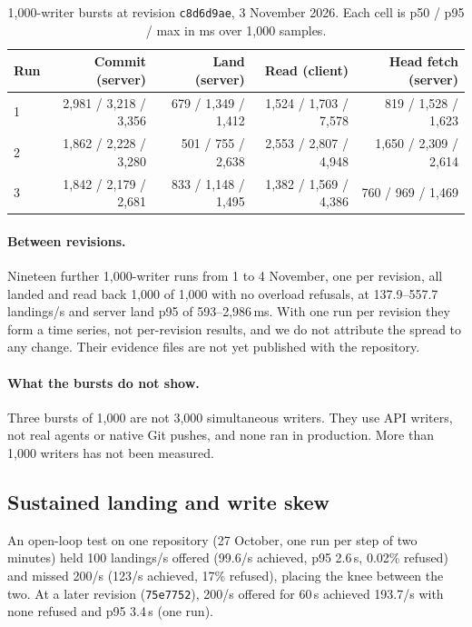\documentclass[11pt]{article}
\newcommand{\code}[1]{\texttt{#1}}
\begin{document}
\begin{table}[t]
\centering
\small
\begin{tabular}{@{}lrrrr@{}}
\toprule
Run & Commit (server) & Land (server) & Read (client) & Head fetch (server) \\
\midrule
1 & 2,981 / 3,218 / 3,356 & 679 / 1,349 / 1,412 & 1,524 / 1,703 / 7,578 & 819 / 1,528 / 1,623 \\
2 & 1,862 / 2,228 / 3,280 & 501 / 755 / 2,638 & 2,553 / 2,807 / 4,948 & 1,650 / 2,309 / 2,614 \\
3 & 1,842 / 2,179 / 2,681 & 833 / 1,148 / 1,495 & 1,382 / 1,569 / 4,386 & 760 / 969 / 1,469 \\
\bottomrule
\end{tabular}
\caption{1,000-writer bursts at revision \code{c8d6d9ae}, 3 November 2026. Each cell is
p50 / p95 / max in ms over 1,000 samples.}
\label{tab:current}
\end{table}

\paragraph{Between revisions.} Nineteen further 1,000-writer runs from 1 to 4 November,
one per revision, all landed and read back 1,000 of 1,000 with no overload refusals, at
137.9--557.7 landings/s and server land p95 of 593--2,986\,ms. With one run per revision
they form a time series, not per-revision results, and we do not attribute the spread
to any change. Their evidence files are not yet published with the repository.

\paragraph{What the bursts do not show.} Three bursts of 1,000 are not 3,000
simultaneous writers. They use API writers, not real agents or native Git pushes, and
none ran in production. More than 1,000 writers has not been measured.

\subsection{Sustained landing and write skew}

An open-loop test on one repository (27 October, one run per step of two minutes) held
100 landings/s offered (99.6/s achieved, p95 2.6\,s, 0.02\% refused) and missed 200/s
(123/s achieved, 17\% refused), placing the knee between the two. At a later revision
(\code{75e7752}), 200/s offered for 60\,s achieved 193.7/s with none refused and p95 3.4\,s
(one run).
\end{document}
